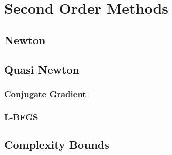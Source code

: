
\chapter{Second Order Methods}

\section{Newton}

\section{Quasi Newton}

\subsection{Conjugate Gradient}
\subsection{L-BFGS}

\section{Complexity Bounds}


\endinput

